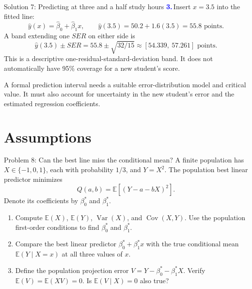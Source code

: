 \documentclass[notes,10pt, aspectratio=169]{beamer}
\newcommand{\E}{\mathbb{E}}
\newcommand{\Var}{\operatorname{Var}}
\newcommand{\Cov}{\operatorname{Cov}}
\newcommand{\answerpart}[1]{\textcolor{blue}{\textbf{#1.}}\,}
\begin{document}
\begin{frame}{Solution 7: Predicting at three and a half study hours}
\small
\answerpart{3}Insert $x=3.5$ into the fitted line:
\[
\widehat y(x)=\widehat\beta_0+\widehat\beta_1x,
\qquad
\widehat y(3.5)=50.2+1.6(3.5)=\boxed{55.8\text{ points}}.
\]
A band extending one $SER$ on either side is
\[
\widehat y(3.5)\pm SER
=55.8\pm\sqrt{32/15}
\approx\boxed{[54.339,\ 57.261]}\text{ points}.
\]
This is a descriptive one-residual-standard-deviation band. It does not automatically have 95\% coverage for a new student's score.

\par\vspace{8pt}
A formal prediction interval needs a suitable error-distribution model and critical value. It must also account for uncertainty in the new student's error and the estimated regression coefficients.
\end{frame}
\fi

\section{Assumptions}

\begin{frame}{Problem 8: Can the best line miss the conditional mean?}
A finite population has $X\in\{-1,0,1\}$, each with probability $1/3$, and $Y=X^2$. The population best linear predictor minimizes
\[
Q(a,b)=\E[(Y-a-bX)^2].
\]
Denote its coefficients by $\beta_0^*$ and $\beta_1^*$.
\begin{enumerate}
\setlength{\itemsep}{9pt}
\item Compute $\E(X)$, $\E(Y)$, $\Var(X)$, and $\Cov(X,Y)$. Use the population first-order conditions to find $\beta_0^*$ and $\beta_1^*$.
\item Compare the best linear predictor $\beta_0^*+\beta_1^*x$ with the true conditional mean $\E(Y\mid X=x)$ at all three values of $x$.
\item Define the population projection error $V=Y-\beta_0^*-\beta_1^*X$. Verify $\E(V)=\E(XV)=0$. Is $\E(V\mid X)=0$ also true?
\end{enumerate}
\end{frame}
\end{document}
